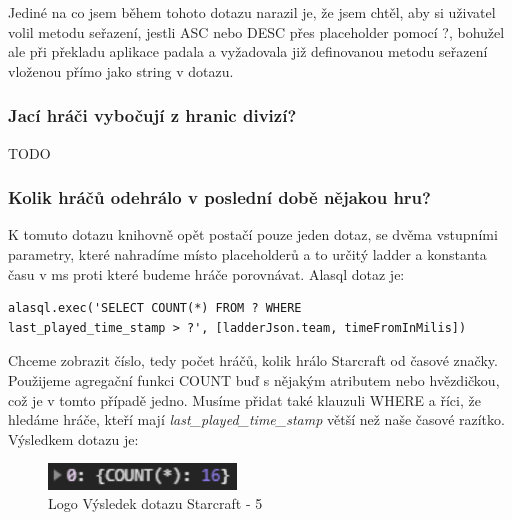 \documentclass[a4, titlepage]{article}
\begin{document}
Jediné na co jsem během tohoto dotazu narazil je, že jsem chtěl, aby si uživatel volil metodu seřazení, jestli ASC nebo DESC přes placeholder pomocí ?, bohužel ale při překladu aplikace padala a vyžadovala již definovanou metodu seřazení vloženou přímo jako string v dotazu.

\subsubsection{Jací hráči vybočují z hranic divizí?}
TODO

\subsubsection{Kolik hráčů odehrálo v poslední době nějakou hru?}
K tomuto dotazu knihovně opět postačí pouze jeden dotaz, se dvěma vstupními parametry, které nahradíme místo placeholderů a to určitý ladder a konstanta času v ms proti které budeme hráče porovnávat. Alasql dotaz je:
\begin{lstlisting}
alasql.exec('SELECT COUNT(*) FROM ? WHERE 
last_played_time_stamp > ?', [ladderJson.team, timeFromInMilis])
\end{lstlisting}
Chceme zobrazit číslo, tedy počet hráčů, kolik hrálo Starcraft od časové značky. Použijeme agregační funkci COUNT buď s nějakým atributem nebo hvězdičkou, což je v tomto případě jedno. Musíme přidat také klauzuli WHERE a říci, že hledáme hráče, kteří mají \textit{last\_played\_time\_stamp} větší než naše časové razítko. Výsledkem dotazu je:

\begin{figure}[h]
    \centering
    \includegraphics[width=5cm]{S5}
    \caption{Logo Výsledek dotazu Starcraft - 5}
\end{figure} 
\end{document}
